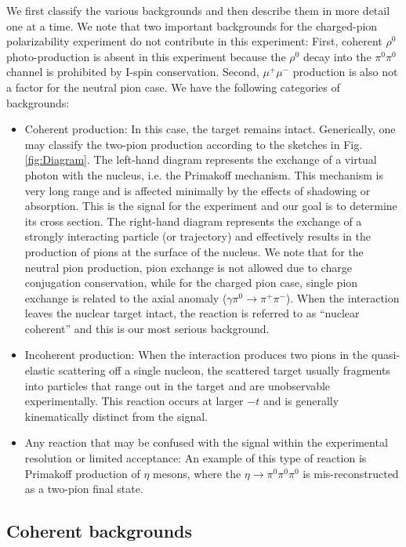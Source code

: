 We first classify the various backgrounds and then describe them in more detail one at a time.
We note that two important backgrounds for the charged-pion polarizability experiment do not contribute in this experiment:
First, coherent $\rho^0$ photo-production is absent in this
experiment because the $\rho^0$ decay into the $\pi^0\pi^0$ channel is prohibited by I-spin conservation.  Second, $\mu^+\mu^-$ production is also not a factor for the neutral pion case.
We have the following categories of backgrounds:
\begin{itemize}
\item Coherent production: In this case, the target remains intact. Generically, one may classify the two-pion production
according to the sketches in Fig.\,\ref{fig:Diagram}. The left-hand diagram represents the exchange of a virtual photon with the nucleus, i.e. the Primakoff
mechanism. This mechanism is very long range and is affected minimally by the effects of shadowing or absorption.  This is the signal for the
experiment and our goal is to determine its cross section.
The right-hand diagram represents the exchange of a strongly interacting particle (or trajectory) and effectively results in the production of pions at the
surface of the nucleus. We note that for the neutral pion production, pion exchange is not allowed due to charge conjugation conservation, while 
for the charged pion case, single pion exchange is related to the axial anomaly ($\gamma \pi^0 \rightarrow \pi^+ \pi^-$).  When the interaction leaves the
nuclear target intact, the reaction is referred to as ``nuclear coherent'' and this is our most serious background. 
\item Incoherent production:  When the interaction produces two pions in the quasi-elastic scattering off a single
nucleon, the scattered target usually fragments into particles that range out in the target and are unobservable experimentally. This reaction occurs at larger $-t$ and is generally
kinematically distinct from the signal.
\item Any reaction that may be confused with the signal within the experimental resolution or limited acceptance:
 An example of this type of reaction is Primakoff production of $\eta$ mesons, where the $\eta\rightarrow \pi^0 \pi^0 \pi^0$  is
mis-reconstructed as a two-pion final state. 
\end{itemize}

\subsection{Coherent backgrounds}
   
